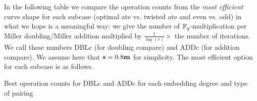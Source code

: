In the following table we compare the operation counts from the \emph{most efficient} 
curve shape for each subcase
(optimal ate vs. twisted ate and even vs. odd)
in what we hope is a meaningful way:
we give the number of $\mathbb{F}_{q}$-multiplication per Miller doubling/Miller addition multiplied by 
$\frac{1}{\log(r)} \times $ the number of iterations. We call these numbers DBLc 
(for doubling compare) and ADDc (for addition compare).
We assume here that $\textbf{s} = 0.8\textbf{m}$ for simplicity.
The most efficient option for each subcase is as follows.

\begin{table}[h]
\centering
\caption{Best operation counts for DBLc and ADDc for each embedding degree and type of pairing}


\end{table}

